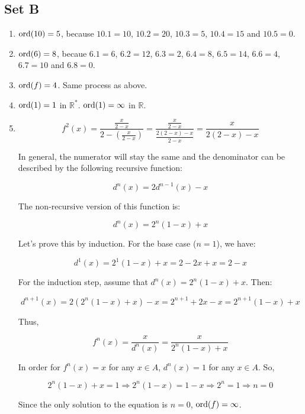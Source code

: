 \subsection{Set B}
\begin{enumerate}
    \item $ \operatorname{ord}(10) = 5 $, because $ 10.1 = 10 $, $ 10.2 = 20 $, $ 10.3 = 5 $, $ 10.4 = 15 $ and $ 10.5 = 0 $.

    \item $ \operatorname{ord}(6) = 8 $, becaue $ 6.1 = 6 $, $ 6.2 = 12 $, $ 6.3 = 2 $, $ 6.4 = 8 $, $ 6.5 = 14 $, $ 6.6 = 4 $, $ 6.7 = 10 $ and $ 6.8 = 0 $.

    \item $ \operatorname{ord}(f) = 4 $. Same process as above.

    \item $ \operatorname{ord}(1) = 1 $ in $ \mathbb{R}^* $. $ \operatorname{ord}(1) = \infty $ in $ \mathbb{R} $.

    \item $$ f^2(x) = \frac{\frac{x}{2-x}}{2 - \left(\frac{x}{2 - x}\right)} = \frac{\frac{x}{2-x}}{\frac{2(2 - x) - x}{2 - x}} = \frac{x}{2(2 - x) - x} $$

    In general, the numerator will stay the same and the denominator can be described by the following recursive function:

    $$
        d^n(x) = 2d^{n - 1}(x) - x
    $$
    
    The non-recursive version of this function is:

    $$
        d^n(x) = 2^n(1 - x) + x
    $$

    Let's prove this by induction. For the base case ($ n = 1 $), we have:

    $$ 
        d^1(x) = 2^1(1 - x) + x = 2 - 2x + x = 2 - x
    $$

    For the induction step, assume that $ d^n(x) = 2^n(1 - x) + x $. Then:
    
    $$ d^{n + 1}(x) = 2(2^n(1 - x) + x) - x = 2^{n + 1} + 2x - x = 2^{n + 1}(1 - x) + x $$

    Thus,

    $$ f^n(x) = \frac{x}{d^n(x)} = \frac{x}{2^n(1 - x) + x} $$
    
    In order for $ f^n(x) = x $ for any $ x \in A $, $ d^n(x) = 1 $ for any $ x \in A $. So,

    $$ 
        2^n(1 - x) + x = 1 \Rightarrow 2^n(1 - x) = 1 - x \Rightarrow 2^n = 1 \Rightarrow n = 0
    $$

    Since the only solution to the equation is $ n = 0 $, $ \operatorname{ord}(f) = \infty$.


\end{enumerate}
